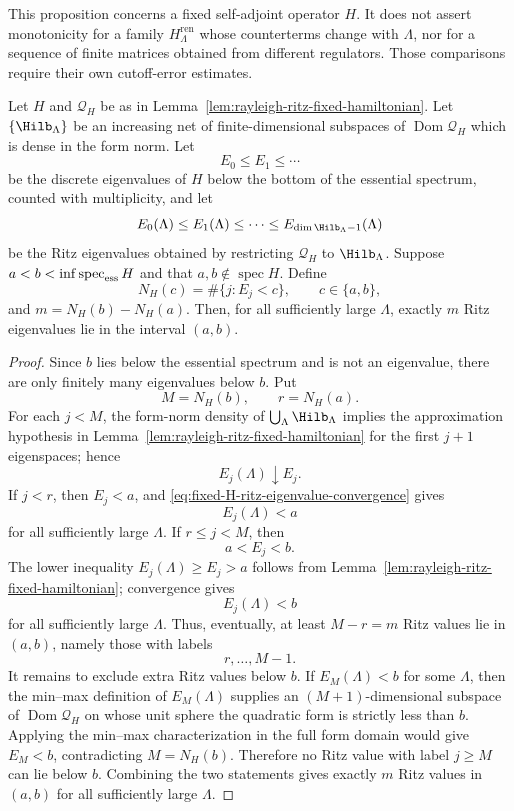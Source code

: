 This proposition concerns a fixed self-adjoint operator \(H\).  It does not
assert monotonicity for a family \(H_\Lambda^{\mathrm{ren}}\) whose
counterterms change with \(\Lambda\), nor for a sequence of finite matrices
obtained from different regulators.  Those comparisons require their own
cutoff-error estimates.

\begin{proposition}
\label{prop:gap-stable-ritz-counting-fixed-hamiltonian}
Let \(H\) and \(\mathcal Q_H\) be as in
Lemma~\ref{lem:rayleigh-ritz-fixed-hamiltonian}.  Let
\(\{\Hilb_\Lambda\}\) be an increasing net of finite-dimensional subspaces of
\(\operatorname{Dom}\mathcal Q_H\) which is dense in the form norm.  Let
\[
  E_0\leq E_1\leq\cdots
\]
be the discrete eigenvalues of \(H\) below the bottom of the essential
spectrum, counted with multiplicity, and let
\[
  E_0(\Lambda)\leq E_1(\Lambda)\leq\cdots
       \leq E_{\dim\Hilb_\Lambda-1}(\Lambda)
\]
be the Ritz eigenvalues obtained by restricting \(\mathcal Q_H\) to
\(\Hilb_\Lambda\).  Suppose \(a<b<\inf\operatorname{spec}_{\rm ess}H\) and
that \(a,b\notin\operatorname{spec}H\).  Define
\[
  N_H(c)=\#\{j:E_j<c\},
  \qquad c\in\{a,b\},
\]
and \(m=N_H(b)-N_H(a)\).  Then, for all sufficiently large \(\Lambda\),
exactly \(m\) Ritz eigenvalues lie in the interval \((a,b)\).
\end{proposition}

\begin{proof}
Since \(b\) lies below the essential spectrum and is not an eigenvalue, there
are only finitely many eigenvalues below \(b\).  Put
\[
  M=N_H(b),\qquad r=N_H(a).
\]
For each \(j<M\), the form-norm density of \(\bigcup_\Lambda\Hilb_\Lambda\)
implies the approximation hypothesis in
Lemma~\ref{lem:rayleigh-ritz-fixed-hamiltonian} for the first
\(j+1\) eigenspaces; hence
\begin{equation}
  E_j(\Lambda)\downarrow E_j .
  \label{eq:fixed-H-ritz-eigenvalue-convergence}
\end{equation}
If \(j<r\), then \(E_j<a\), and
\eqref{eq:fixed-H-ritz-eigenvalue-convergence} gives
\[
  E_j(\Lambda)<a
\]
for all sufficiently large \(\Lambda\).  If \(r\leq j<M\), then
\[
  a<E_j<b .
\]
The lower inequality \(E_j(\Lambda)\geq E_j>a\) follows from
Lemma~\ref{lem:rayleigh-ritz-fixed-hamiltonian}; convergence gives
\[
  E_j(\Lambda)<b
\]
for all sufficiently large \(\Lambda\).  Thus, eventually, at least
\(M-r=m\) Ritz values lie in \((a,b)\), namely those with labels
\[
  r,\ldots,M-1 .
\]
It remains to exclude extra Ritz values below \(b\).  If
\(E_M(\Lambda)<b\) for some \(\Lambda\), then the min--max definition of
\(E_M(\Lambda)\) supplies an \((M+1)\)-dimensional subspace of
\(\operatorname{Dom}\mathcal Q_H\) on whose unit sphere the quadratic form is
strictly less than \(b\).  Applying the min--max characterization in the full
form domain would give \(E_M<b\), contradicting \(M=N_H(b)\).  Therefore no
Ritz value with label \(j\geq M\) can lie below \(b\).  Combining the two
statements gives exactly \(m\) Ritz values in \((a,b)\) for all sufficiently
large \(\Lambda\).
\end{proof}

